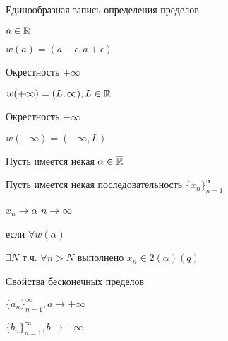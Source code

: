 Единообразная запись определения пределов

$ a \in \mathbb{R}$

$w(a) = (a - \epsilon, a + \epsilon)$

Окрестность $+\infty$

$w(+\infty) = (L, \infty), L \in \mathbb{R}$

Окрестность $-\infty$

$w(-\infty) = (-\infty, L)$

Пусть имеется некая 
$\alpha \in \overline {\mathbb{R}}$

Пусть имеется некая последовательность
$\{x_n\}_{n=1}^\infty $

$x_n \to \alpha$
$n \to \infty$

если $\forall w (\alpha)$

$\exists N$ т.ч. $\forall n > N$ выполнено
$x_n \in 2 (\alpha)(q)$

Свойства бесконечных пределов

$\{a_n\}_{n=1}^\infty, a \to +\infty$

$\{b_n\}_{n=1}^\infty, b \to -\infty$

